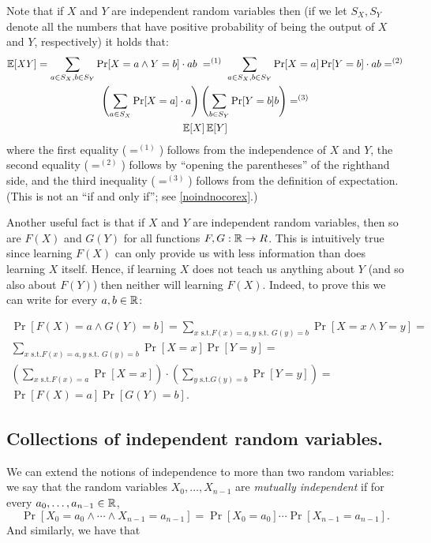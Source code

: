 Note that if \(X\) and \(Y\) are independent random variables then (if
we let \(S_X,S_Y\) denote all the numbers that have positive probability
of being the output of \(X\) and \(Y\), respectively) it holds that: \[
\begin{gathered}
\operatorname*{\mathbb E}[ \mathit{XY} ] = \sum_{a \in S_X,b \in S_Y} {\textstyle\Pr[X=a \wedge Y=b]}\cdot ab \; =^{(1)} \; \sum_{a \in S_X,b \in S_Y} {\textstyle \Pr[X=a]\Pr[Y=b]}\cdot ab =^{(2)} \\
\left(\sum_{a \in S_X} {\textstyle \Pr[X=a]}\cdot a\right)\left(\sum_{b \in S_Y} {\textstyle \Pr[Y=b]}b\right) =^{(3)} \\
\operatorname*{\mathbb E}[X] \operatorname*{\mathbb E}[Y]
\end{gathered}
\] where the first equality (\(=^{(1)}\)) follows from the independence
of \(X\) and \(Y\), the second equality (\(=^{(2)}\)) follows by
``opening the parentheses'' of the righthand side, and the third
inequality (\(=^{(3)}\)) follows from the definition of expectation.
(This is not an ``if and only if''; see \cref{noindnocorex}.)

Another useful fact is that if \(X\) and \(Y\) are independent random
variables, then so are \(F(X)\) and \(G(Y)\) for all functions
\(F,G:{\mathbb{R}} \rightarrow R\). This is intuitively true since learning
\(F(X)\) can only provide us with less information than does learning
\(X\) itself. Hence, if learning \(X\) does not teach us anything about
\(Y\) (and so also about \(F(Y)\)) then neither will learning \(F(X)\).
Indeed, to prove this we can write for every \(a,b \in {\mathbb{R}}\):

\[
\begin{gathered}
\Pr[ F(X)=a \wedge G(Y)=b ] = \sum_{x \text{ s.t.} F(x)=a, y \text{ s.t. } G(y)=b} \Pr[ X=x \wedge Y=y ] = \\
\sum_{x \text{ s.t.} F(x)=a, y \text{ s.t. } G(y)=b} \Pr[ X=x ] \Pr[  Y=y ]  = \\
\left( \sum_{x \text{ s.t.} F(x)=a } \Pr[X=x ] \right) \cdot \left( \sum_{y \text{ s.t.} G(y)=b } \Pr[Y=y ] \right) = \\
\Pr[ F(X)=a] \Pr[G(Y)=b] .
\end{gathered}
\]

\subsection{Collections of independent random
variables.}\label{Collections-of-independen}

We can extend the notions of independence to more than two random
variables: we say that the random variables \(X_0,\ldots,X_{n-1}\) are
\emph{mutually independent} if for every \(a_0,\ldots,a_{n-1} \in {\mathbb{R}}\),
\[
\Pr\left[X_0=a_0 \wedge \cdots \wedge X_{n-1}=a_{n-1}\right]=\Pr[X_0=a_0]\cdots \Pr[X_{n-1}=a_{n-1}] .
\] And similarly, we have that

